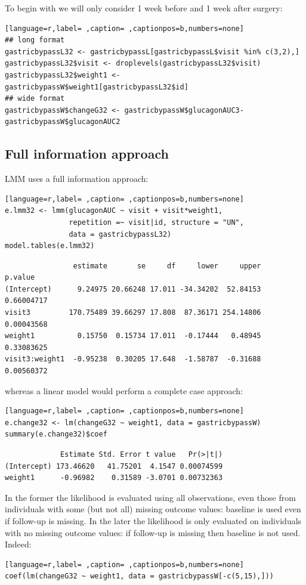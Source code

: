\documentclass[12pt]{article}
\begin{document}
To begin with we will only consider 1 week before and 1 week after
surgery:
\begin{lstlisting}[language=r,label= ,caption= ,captionpos=b,numbers=none]
## long format
gastricbypassL32 <- gastricbypassL[gastricbypassL$visit %in% c(3,2),]
gastricbypassL32$visit <- droplevels(gastricbypassL32$visit)
gastricbypassL32$weight1 <- gastricbypassW$weight1[gastricbypassL32$id]
## wide format
gastricbypassW$changeG32 <- gastricbypassW$glucagonAUC3-gastricbypassW$glucagonAUC2
\end{lstlisting}

\clearpage

\subsection{Full information approach}
\label{sec:org66e42be}

LMM uses a full information approach:
\begin{lstlisting}[language=r,label= ,caption= ,captionpos=b,numbers=none]
e.lmm32 <- lmm(glucagonAUC ~ visit + visit*weight1,
               repetition =~ visit|id, structure = "UN",
               data = gastricbypassL32)
model.tables(e.lmm32)
\end{lstlisting}

\begin{verbatim}
                estimate       se     df     lower     upper    p.value
(Intercept)      9.24975 20.66248 17.011 -34.34202  52.84153 0.66004717
visit3         170.75489 39.66297 17.808  87.36171 254.14806 0.00043568
weight1          0.15750  0.15734 17.011  -0.17444   0.48945 0.33083625
visit3:weight1  -0.95238  0.30205 17.648  -1.58787  -0.31688 0.00560372
\end{verbatim}


whereas a linear model would perform a complete case approach:
\begin{lstlisting}[language=r,label= ,caption= ,captionpos=b,numbers=none]
e.change32 <- lm(changeG32 ~ weight1, data = gastricbypassW)
summary(e.change32)$coef
\end{lstlisting}

\begin{verbatim}
             Estimate Std. Error t value   Pr(>|t|)
(Intercept) 173.46620   41.75201  4.1547 0.00074599
weight1      -0.96982    0.31589 -3.0701 0.00732363
\end{verbatim}


In the former the likelihood is evaluated using all observations, even
those from individuals with some (but not all) missing outcome values:
baseline is used even if follow-up is missing. In the later the
likelihood is only evaluated on individuals with no missing outcome
values: if follow-up is missing then baseline is not used. Indeed:
\begin{lstlisting}[language=r,label= ,caption= ,captionpos=b,numbers=none]
coef(lm(changeG32 ~ weight1, data = gastricbypassW[-c(5,15),]))
\end{lstlisting}
\end{document}
